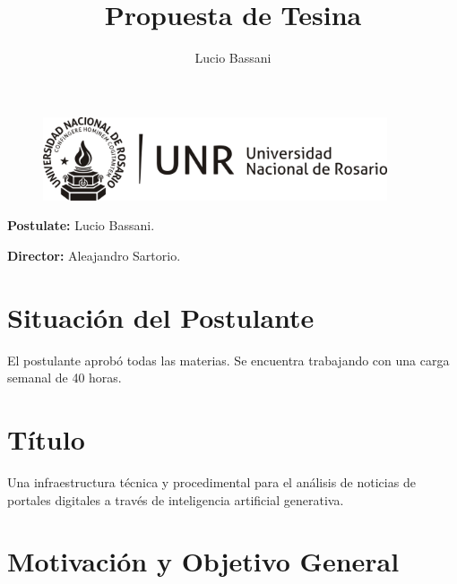 \documentclass[12pt]{article}
\title{Propuesta de Tesina}
\begin{document}
\author{Lucio Bassani}

\maketitle

\begin{figure}[h]
\centering
\includegraphics[width=4in]{LOGO-UNR-NEGRO.png}
\end{figure}

\textbf{Postulate:} Lucio Bassani.

\textbf{Director:} Aleajandro Sartorio.



\section{Situación del Postulante}
El postulante aprobó todas las materias. Se encuentra trabajando con una carga semanal de 40 horas.

\section{Título}
Una infraestructura técnica y procedimental para el análisis de noticias de portales digitales a través de inteligencia artificial generativa.



\section{Motivación y Objetivo General}

\end{document}
